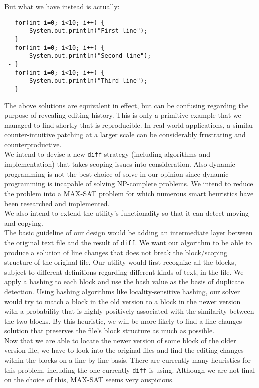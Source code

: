 \documentclass{article}
\begin{document}
\pagebreak
But what we have instead is actually:
\begin{lstlisting}
   for(int i=0; i<10; i++) {
       System.out.println("First line");
   }
   for(int i=0; i<10; i++) {
 -     System.out.println("Second line");
 - }
 - for(int i=0; i<10; i++) {
       System.out.println("Third line");
   }
\end{lstlisting}

The above solutions are equivalent in effect, but can be confusing regarding the purpose of revealing editing history. This is only a primitive example that we managed to find shortly that is reproducible. In real world applications, a similar counter-intuitive patching at a larger scale can be considerably frustrating and counterproductive.\\

We intend to devise a new \texttt{diff} strategy (including algorithms and implementation) that takes scoping issues into consideration. Also dynamic programming is not the best choice of solve in our opinion since dynamic programming is incapable of solving NP-complete problems. We intend to reduce the problem into a MAX-SAT problem for which numerous smart heuristics have been researched and implemented.\\

We also intend to extend the utility's functionality so that it can detect moving and copying.\\

The basic guideline of our design would be adding an intermediate layer between the original text file and the result of \texttt{diff}. We want our algorithm to be able to produce a solution of line changes that does not break the block/scoping structure of the original file. Our utility would first recognize all the blocks, subject to different definitions regarding different kinds of text, in the file. We apply a hashing to each block and use the hash value as the basis of duplicate detection. Using hashing algorithms like locality-sensitive hashing, our solver would try to match a block in the old version to a block in the newer version with a probability that is highly positively associated with the similarity between the two blocks. By this heuristic, we will be more likely to find a line changes solution that preserves the file's block structure as much as possible.\\

Now that we are able to locate the newer version of some block of the older version file, we have to look into the original files and find the editing changes within the blocks on a line-by-line basis. There are currently many heuristics for this problem, including the one currently \texttt{diff} is using. Although we are not final on the choice of this, MAX-SAT seems very auspicious.
\end{document}
